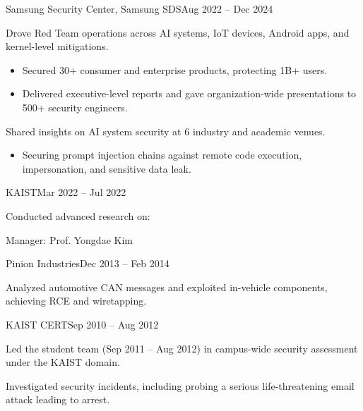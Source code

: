 \begin{timeitemize}{Samsung Security Center, Samsung SDS}{Aug 2022 -- Dec 2024}
    \item Drove Red Team operations across AI systems, IoT devices, Android apps, and kernel-level mitigations.
        \begin{itemize}[label=·]
        \item Secured 30+ consumer and enterprise products, protecting 1B+ users.
        \item Delivered executive-level reports and gave organization-wide presentations to 500+ security engineers.
        \end{itemize}
    \item Shared insights on AI system security at 6 industry and academic venues.
        \begin{itemize}[label=·]
        \item Securing prompt injection chains against remote code execution, impersonation, and sensitive data leak.
        \end{itemize}
\end{timeitemize}

\begin{timeitemize}{KAIST}{Mar 2022 -- Jul 2022}
    \item Conducted advanced research on:
    \item Manager: Prof. Yongdae Kim
\end{timeitemize}

\begin{timeitemize}{Pinion Industries}{Dec 2013 -- Feb 2014}
    \item Analyzed automotive CAN messages and exploited in-vehicle components, achieving RCE and wiretapping.
\end{timeitemize}

\begin{timeitemize}{KAIST CERT}{Sep 2010 -- Aug 2012}
    \item Led the student team (Sep 2011 – Aug 2012) in campus-wide security assessment under the KAIST domain.
    \item Investigated security incidents, including probing a serious life-threatening email attack leading to arrest.
\end{timeitemize}

